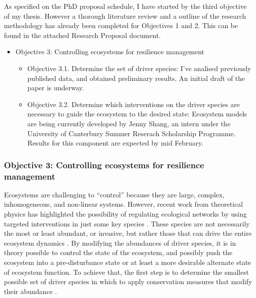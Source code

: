 \documentclass[a4paper]{article}
\begin{document}
As specified on the PhD proposal schedule, I have started by the third objective of my thesis. However a thorough literature review and a outline of the research methodology has already been completed for Objectives 1 and 2. This can be found in the attached Research Proposal document. 

\begin{itemize}
	\item Objective 3: Controlling ecosystems for resilience management
	\begin{itemize}
		\item Objective 3.1. Determine the set of driver species: I've analised previously published data, and obtained preliminary results. An initial draft of the paper is underway. 
		\item Objective 3.2. Determine which interventions on the driver species are necessary to guide the ecosystem to the desired state: Ecosystem models are being currently developed by Jenny Shang, an intern under the University of Canterbury Summer Reserach Scholarship Programme. Results for this component are expected by mid February.
	\end{itemize}
\end{itemize}

\subsubsection*{Objective 3: Controlling ecosystems for resilience management}
 

Ecosystems are challenging to ``control'' because they are large, complex, inhomogeneous, and non-linear systems.
However, recent work from theoretical physics has highlighted the possibility of regulating ecological networks by using targeted interventions in just some key species \autocite{Isbell2013, Cornelius2013}.
These species are not necessarily the most or least abundant, or invasive, but rather those that can drive the entire ecosystem dynamics \autocite{Liu2011} .
By modifying the abundances of driver species, it is in theory possible to control the state of the ecosystem, and possibly push the ecosystem into a pre-disturbance state or at least a more desirable alternate state of ecosystem function. To achieve that, the first step is to determine the smallest possible set of driver species in which to apply conservation measures that modify their abundance \autocite{Liu2011, Isbell2013}.
\end{document}
